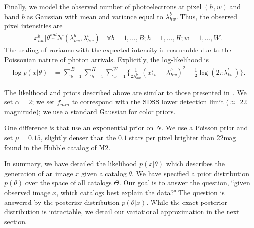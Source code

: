 Finally, we model the observed number of photoelectrons at pixel $(h,w)$ and band $b$ as Gaussian
with mean and variance equal to $\lambda^b_{hw}$. 
Thus, the observed pixel intensities are
\begin{align}
  x_{hw}^b | \theta \overset{ind}{\sim} \mathcal{N}(\lambda^b_{hw}, \lambda^b_{hw})
  \quad\forall b = 1, ..., B; h = 1,..., H; w = 1, ..., W. 
\end{align}
The scaling of variance with the expected intensity is reasonable due to the Poissonian nature of photon arrivals. 
Explicitly, the log-likelihood is
\begin{align}
    \log p(x | \theta) &= \sum_{b = 1}^{B} \sum_{h = 1}^H \sum_{w = 1}^W 
        \Big\{\frac{1}{2\lambda^b_{hw}}(x_{hw}^b  - \lambda^b_{hw})^2 - 
               \frac{1}{2}\log(2\pi\lambda^b_{hw})\Big\}
    \label{eq:loglik}.
\end{align}

The likelihood and priors described above are similar to those
presented in~\cite{Portillo_2017, Feder_2019}. We set $\alpha = 2$; we set 
$f_{min}$ to correspond with the SDSS 
lower detection limit ($\approx$ 22 magnitude); we use a standard Gaussian for color priors. 

One difference is that \cite{Portillo_2017, Feder_2019} use an exponential prior on $N$. We use a Poisson prior and set $\mu = 0.15$, slightly denser than the $0.1$ stars per pixel 
brighter than 22mag found in the Hubble catalog of M2. 

In summary, we have detailed the likelihood
$p(x | \theta)$ which describes the generation of an image $x$ given a catalog $\theta$. We have specified a prior distribution $p(\theta)$ over the space 
of all catalogs $\Theta$. 
Our goal is to answer the question, ``given observed image $x$, which 
catalogs best explain the data?"
The question is answered by the posterior distribution $p(\theta | x)$. While 
the exact posterior distribution is intractable, we detail our variational approximation in the next section. 